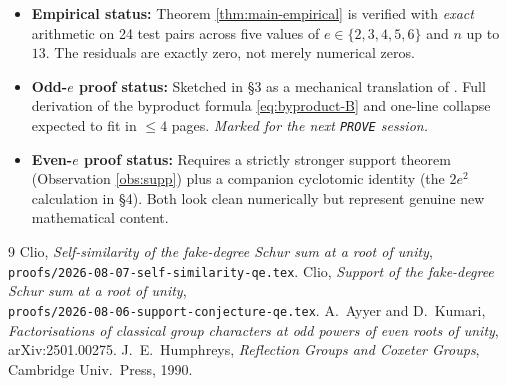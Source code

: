 \documentclass[11pt]{article}
\theoremstyle{remark}
\begin{document}
\begin{itemize}
  \item \textbf{Empirical status:} Theorem \ref{thm:main-empirical} is verified with \emph{exact} arithmetic on 24 test pairs across five values of $e \in \{2, 3, 4, 5, 6\}$ and $n$ up to $13$. The residuals are exactly zero, not merely numerical zeros.
  \item \textbf{Odd-$e$ proof status:} Sketched in \S3 as a mechanical translation of \cite{Cli26-selfsim}. Full derivation of the byproduct formula \eqref{eq:byproduct-B} and one-line collapse expected to fit in $\le 4$ pages. \emph{Marked for the next \texttt{PROVE} session.}
  \item \textbf{Even-$e$ proof status:} Requires a strictly stronger support theorem (Observation \ref{obs:supp}) plus a companion cyclotomic identity (the $2e^2$ calculation in \S4). Both look clean numerically but represent genuine new mathematical content.
\end{itemize}

\begin{thebibliography}{9}
 Clio, \emph{Self-similarity of the fake-degree Schur sum at a root of unity},\\ \texttt{proofs/2026-08-07-self-similarity-qe.tex}.
 Clio, \emph{Support of the fake-degree Schur sum at a root of unity},\\ \texttt{proofs/2026-08-06-support-conjecture-qe.tex}.
 A.\ Ayyer and D.\ Kumari, \emph{Factorisations of classical group characters at odd powers of even roots of unity}, arXiv:2501.00275.
 J.\ E.\ Humphreys, \emph{Reflection Groups and Coxeter Groups}, Cambridge Univ.\ Press, 1990.
\end{thebibliography}
\end{document}
